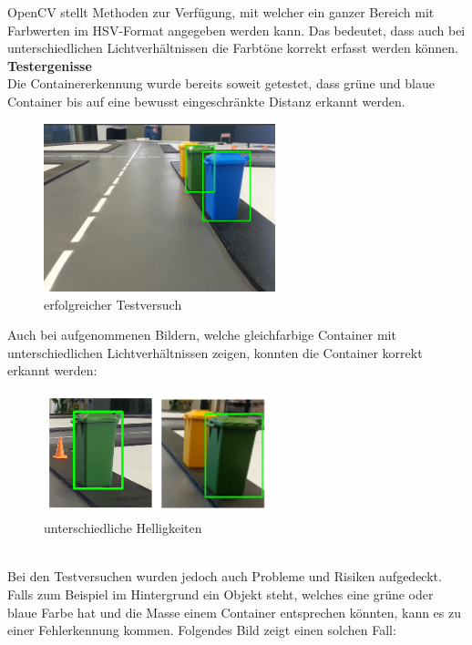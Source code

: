 OpenCV stellt Methoden zur Verfügung, mit welcher ein ganzer Bereich mit Farbwerten im HSV-Format angegeben werden kann. Das bedeutet, dass auch bei unterschiedlichen Lichtverhältnissen die Farbtöne korrekt erfasst werden können.
\\[0.2cm]
\textbf{Testergenisse} \\[0.2cm]
Die Containererkennung wurde bereits soweit getestet, dass grüne und blaue Container bis auf eine bewusst eingeschränkte Distanz erkannt werden. 
\begin{figure}[H]%
\centering
\includegraphics[width=0.6\textwidth]{03_Loesungskonzept/pictures/containererkennung_blau_gruen.png}
\caption{erfolgreicher Testversuch}
\label{fig:erfolgreicher Testversuch}
\end{figure}
\flushleft
Auch bei aufgenommenen Bildern, welche gleichfarbige Container mit unterschiedlichen Lichtverhältnissen zeigen, konnten die Container korrekt erkannt werden:
\begin{figure}[H]%
\centering
\includegraphics[width=0.6\textwidth]{03_Loesungskonzept/pictures/containererkennung_div_brightness.png}
\caption{unterschiedliche Helligkeiten}
\label{fig:unterschiedliche Helligkeiten}
\end{figure} \\
\flushleft
Bei den Testversuchen wurden jedoch auch Probleme und Risiken aufgedeckt. Falls zum Beispiel im Hintergrund ein Objekt steht, welches eine grüne oder blaue Farbe hat und die Masse einem Container entsprechen könnten, kann es zu einer Fehlerkennung kommen. Folgendes Bild zeigt einen solchen Fall:
